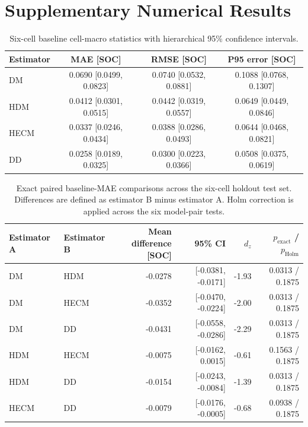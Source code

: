 \documentclass[review,nopreprintline]{elsarticle}
\begin{document}


\clearpage
\section{Supplementary Numerical Results}

\begin{table}[h]
\centering
\footnotesize
\setlength{\tabcolsep}{3pt}
\caption{Six-cell baseline cell-macro statistics with hierarchical 95\% confidence intervals.}
\label{tab:appendix_baseline_metrics}
\begin{tabular}{lccc}
\toprule
Estimator & MAE [SOC] & RMSE [SOC] & P95 error [SOC] \\
\midrule
DM   & 0.0690 [0.0499, 0.0823] & 0.0740 [0.0532, 0.0881] & 0.1088 [0.0768, 0.1307] \\
HDM  & 0.0412 [0.0301, 0.0515] & 0.0442 [0.0319, 0.0557] & 0.0649 [0.0449, 0.0846] \\
HECM & 0.0337 [0.0246, 0.0434] & 0.0388 [0.0286, 0.0493] & 0.0644 [0.0468, 0.0821] \\
DD   & 0.0258 [0.0189, 0.0325] & 0.0300 [0.0223, 0.0366] & 0.0508 [0.0375, 0.0619] \\
\bottomrule
\end{tabular}
\end{table}

\begin{table}[h]
\centering
\footnotesize
\setlength{\tabcolsep}{2pt}
\caption{Exact paired baseline-MAE comparisons across the six-cell holdout test set. Differences are defined as estimator B minus estimator A. Holm correction is applied across the six model-pair tests.}
\label{tab:appendix_baseline_pair_tests}
\begin{tabular}{llrrrr}
\toprule
Estimator A & Estimator B & \shortstack{Mean difference\\{[SOC]}} & 95\% CI & $d_z$ & \shortstack{$p_{\mathrm{exact}}$ /\\$p_{\mathrm{Holm}}$} \\
\midrule
DM   & HDM  & -0.0278 & [-0.0381, -0.0171] & -1.93 & 0.0313 / 0.1875 \\
DM   & HECM & -0.0352 & [-0.0470, -0.0224] & -2.00 & 0.0313 / 0.1875 \\
DM   & DD   & -0.0431 & [-0.0558, -0.0286] & -2.29 & 0.0313 / 0.1875 \\
HDM  & HECM & -0.0075 & [-0.0162,  0.0015] & -0.61 & 0.1563 / 0.1875 \\
HDM  & DD   & -0.0154 & [-0.0243, -0.0084] & -1.39 & 0.0313 / 0.1875 \\
HECM & DD   & -0.0079 & [-0.0176, -0.0005] & -0.68 & 0.0938 / 0.1875 \\
\bottomrule
\end{tabular}
\end{table}
\end{document}
